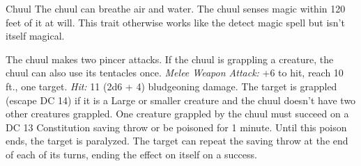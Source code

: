 \documentclass[10pt,a4paper,twoside,twocolumn,openany,bg=none,nodeprecatedcode]{dndbook}
\begin{document}
\begin{DndMonster}[float*=t]{Chuul}
\DndMonsterBasics[
armor-class = {16 (natural armor)},
hit-points = {\DndDice{11d10 + 33}},
speed = {30 ft., 30 ft. (key)}
]
\DndMonsterAbilityScores[
 str = 19,
 dex = 10,
 con = 16,
 int = 5,
 wis = 11,
 cha = 5
]
\DndMonsterDetails[
skills = {Perception +4},
damage-immunities = {poison},
senses = {darkvision 60 ft., passive perception 14},
languages = {understands Deep Speech but can't speak},
challenge = 4,
]
The chuul can breathe air and water.
The chuul senses magic within 120 feet of it at will. This trait otherwise works like the detect magic spell but isn't itself magical.
\par
{}
The chuul makes two pincer attacks. If the chuul is grappling a creature, the chuul can also use its tentacles once.
\textsl{Melee Weapon Attack:} +6 to hit, reach 10 ft., one target. \textsl{Hit:} 11 (2d6 + 4) bludgeoning damage. The target is grappled (escape DC 14) if it is a Large or smaller creature and the chuul doesn't have two other creatures grappled.
One creature grappled by the chuul must succeed on a DC 13 Constitution saving throw or be poisoned for 1 minute. Until this poison ends, the target is paralyzed. The target can repeat the saving throw at the end of each of its turns, ending the effect on itself on a success.
\end{DndMonster}
\end{document}
